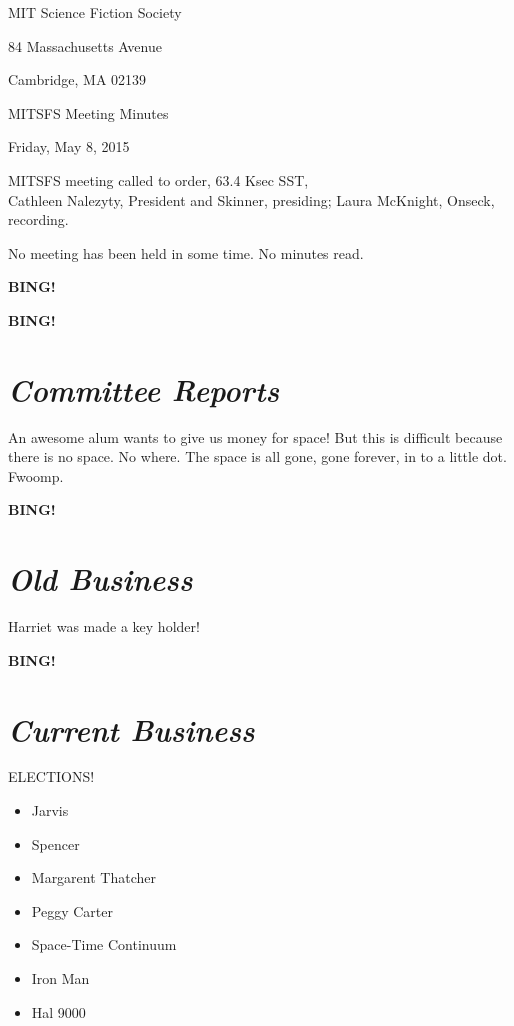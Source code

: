 \documentclass[10pt]{article}
\newcommand{\bing}{{\bf BING!} }
\newcommand{\goto}[1]{\bing \vskip 12pt \section*{{\em{#1}}}}
\newcommand{\skinner}{Cathleen Nalezyty, President and Skinner}
\newcommand{\onseck}{Laura McKnight, Onseck}
\newcommand{\meetingdate}{Friday, May 8, 2015}
\begin{document}
\begin{center}



MIT Science Fiction Society



84 Massachusetts Avenue



Cambridge, MA 02139



\vspace{12pt}



MITSFS Meeting Minutes



\meetingdate



\end{center}



\vspace{18pt}



\setlength{\parskip}{6pt}



\noindent

MITSFS meeting called to order, 63.4 Ksec SST, \\

\skinner, presiding; \onseck, recording.



No meeting has been held in some time.  No minutes read.



\bing



\goto{Committee Reports}

An awesome alum wants to give us money for space! But this is difficult because there is no space. No where. The space is all gone, gone forever, in to a little dot. Fwoomp.



\goto{Old Business}

Harriet was made a key holder!



\goto{Current Business}

ELECTIONS!



\begin{itemize}

\item Jarvis

\item Spencer

\item Margarent Thatcher

\item Peggy Carter

\item Space-Time Continuum

\item Iron Man

\item Hal 9000

\end{itemize}
\end{document}
